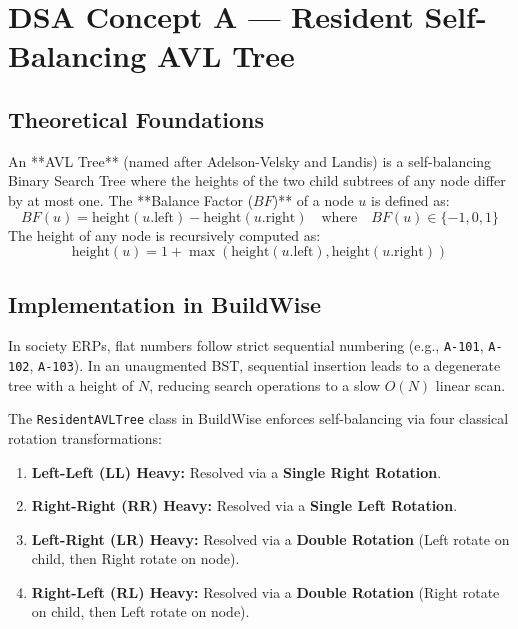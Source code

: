 \documentclass[12pt,a4paper]{article}
\begin{document}
\section{DSA Concept A --- Resident Self-Balancing AVL Tree}

\subsection{Theoretical Foundations}
An **AVL Tree** (named after Adelson-Velsky and Landis) is a self-balancing Binary Search Tree where the heights of the two child subtrees of any node differ by at most one. The **Balance Factor ($BF$)** of a node $u$ is defined as:
\begin{equation}
    BF(u) = \text{height}(u.\text{left}) - \text{height}(u.\text{right}) \quad \text{where} \quad BF(u) \in \{-1, 0, 1\}
\end{equation}
The height of any node is recursively computed as:
\begin{equation}
    \text{height}(u) = 1 + \max(\text{height}(u.\text{left}), \text{height}(u.\text{right}))
\end{equation}

\subsection{Implementation in BuildWise}
In society ERPs, flat numbers follow strict sequential numbering (e.g., \texttt{A-101}, \texttt{A-102}, \texttt{A-103}). In an unaugmented BST, sequential insertion leads to a degenerate tree with a height of $N$, reducing search operations to a slow $O(N)$ linear scan.

The \texttt{ResidentAVLTree} class in BuildWise enforces self-balancing via four classical rotation transformations:
\begin{enumerate}[leftmargin=1.5em]
    \item \textbf{Left-Left (LL) Heavy:} Resolved via a \textbf{Single Right Rotation}.
    \item \textbf{Right-Right (RR) Heavy:} Resolved via a \textbf{Single Left Rotation}.
    \item \textbf{Left-Right (LR) Heavy:} Resolved via a \textbf{Double Rotation} (Left rotate on child, then Right rotate on node).
    \item \textbf{Right-Left (RL) Heavy:} Resolved via a \textbf{Double Rotation} (Right rotate on child, then Left rotate on node).
\end{enumerate}
\end{document}
